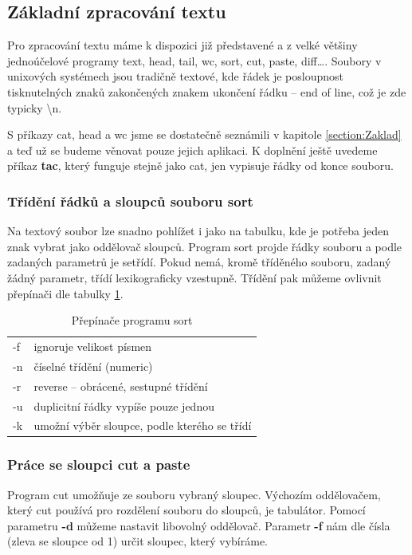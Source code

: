 \documentclass{article}
\begin{document}
\subsection{Základní zpracování textu}
Pro zpracování textu máme k dispozici již představené a z velké většiny jednoúčelové programy text, head, tail, wc, sort, cut, paste, diff\dots. Soubory v unixových systémech jsou tradičně textové, kde řádek je posloupnost tisknutelných znaků zakončených znakem ukončení řádku -- end of line, což je zde typicky \textbackslash n.

S příkazy cat, head a wc jsme se dostatečně seznámili v kapitole \ref{section:Zaklad} a teď už se budeme věnovat pouze jejich aplikaci. K doplnění ještě uvedeme příkaz \textbf{tac}, který funguje stejně jako cat, jen vypisuje řádky od konce souboru.

\subsubsection{Třídění řádků a sloupců souboru sort}
Na textový soubor lze snadno pohlížet i jako na tabulku, kde je potřeba jeden znak vybrat jako oddělovač sloupců. Program sort projde řádky souboru a podle zadaných parametrů je setřídí. Pokud nemá, kromě tříděného souboru, zadaný žádný parametr, třídí lexikograficky vzestupně. Třídění pak můžeme ovlivnit přepínači dle tabulky \ref{tabSort}.

\begin{table}
\begin{center}
\begin{tabular}{l l}
-f & ignoruje velikost písmen\\
-n & číselné třídění (numeric)\\
-r & reverse -- obrácené, sestupné třídění\\
-u & duplicitní řádky vypíše pouze jednou\\
-k & umožní výběr sloupce, podle kterého se třídí\\
\end{tabular}
\caption{Přepínače programu sort}
\end{center}
\label{tabSort}
\end{table}

\subsubsection{Práce se sloupci cut a paste}
Program cut umožňuje ze souboru  vybraný sloupec. Výchozím oddělovačem, který cut používá pro rozdělení souboru do sloupců, je tabulátor. Pomocí parametru \textbf{-d} můžeme nastavit libovolný oddělovač. Parametr \textbf{-f} nám dle čísla (zleva se sloupce  od 1) určit sloupec, který vybíráme.
\end{document}
